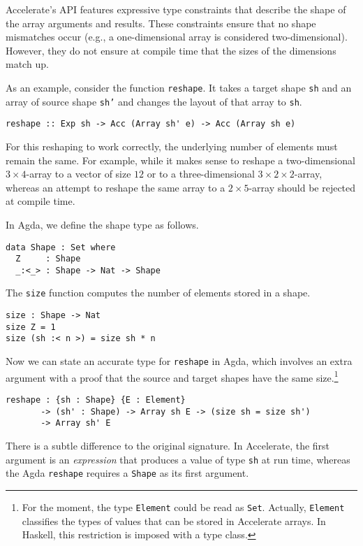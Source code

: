 \documentclass{llncs}
\begin{document}
Accelerate's API features expressive type constraints that describe
the shape of the array arguments and results. These constraints ensure
that no shape mismatches occur (e.g., a one-dimensional array is
considered two-dimensional). However, they do not ensure at compile
time that the sizes of the dimensions match up.

As an example, consider the function \texttt{reshape}. 
It takes a target shape \texttt{sh} and an array of source shape
\texttt{sh'} and changes the layout of that array to \texttt{sh}. 
\begin{verbatim}
reshape :: Exp sh -> Acc (Array sh' e) -> Acc (Array sh e)
\end{verbatim}
For this reshaping to work correctly, the underlying
number of elements must remain the same. For example, while it makes sense
to reshape a two-dimensional $3\times 4$-array  to a vector of size
$12$ or to a three-dimensional $3\times2\times2$-array, whereas an attempt to
reshape the same array to a $2\times5$-array should be rejected at
compile time.

In Agda, we define the shape type as follows.
\begin{verbatim}
data Shape : Set where
  Z     : Shape
  _:<_> : Shape -> Nat -> Shape
\end{verbatim}
The \texttt{size} function computes the number of elements stored in a
shape.
\begin{verbatim}
size : Shape -> Nat
size Z = 1
size (sh :< n >) = size sh * n
\end{verbatim}
Now we can state an accurate type for \texttt{reshape} in Agda, which
involves an extra argument with a proof that the source and
target shapes have the same size.\footnote{For the moment, the type
  \texttt{Element} could be read as \texttt{Set}. Actually,
  \texttt{Element} classifies the types of values that can be stored
  in Accelerate arrays. In Haskell, this restriction is imposed with a
  type class.}
\begin{verbatim}
reshape : {sh : Shape} {E : Element}
       -> (sh' : Shape) -> Array sh E -> (size sh = size sh')
       -> Array sh' E
\end{verbatim}
There is a subtle difference to the original signature. In
Accelerate, the first argument is an \emph{expression} that produces a
value of type \texttt{sh} at run time, whereas the Agda
\texttt{reshape} requires a \texttt{Shape} as its first argument.
\end{document}
